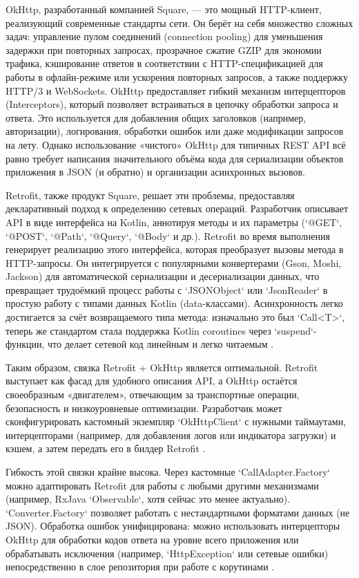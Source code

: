 OkHttp, разработанный компанией Square, — это мощный HTTP-клиент, реализующий современные стандарты сети. Он берёт на себя множество сложных задач: управление пулом соединений (connection pooling) для уменьшения задержки при повторных запросах, прозрачное сжатие GZIP для экономии трафика, кэширование ответов в соответствии с HTTP-спецификацией для работы в офлайн-режиме или ускорения повторных запросов, а также поддержку HTTP/3 и WebSockets. OkHttp предоставляет гибкий механизм интерцепторов (Interceptors), который позволяет встраиваться в цепочку обработки запроса и ответа. Это используется для добавления общих заголовков (например, авторизации), логирования, обработки ошибок или даже модификации запросов на лету. Однако использование «чистого» OkHttp для типичных REST API всё равно требует написания значительного объёма кода для сериализации объектов приложения в JSON (и обратно) и организации асинхронных вызовов.

Retrofit, также продукт Square, решает эти проблемы, предоставляя декларативный подход к определению сетевых операций. Разработчик описывает API в виде интерфейса на Kotlin, аннотируя методы и их параметры (`@GET`, `@POST`, `@Path`, `@Query`, `@Body` и др.). Retrofit во время выполнения генерирует реализацию этого интерфейса, которая преобразует вызовы метода в HTTP-запросы. Он интегрируется с популярными конвертерами (Gson, Moshi, Jackson) для автоматической сериализации и десериализации данных, что превращает трудоёмкий процесс работы с `JSONObject` или `JsonReader` в простую работу с типами данных Kotlin (data-классами). Асинхронность легко достигается за счёт возвращаемого типа метода: изначально это был `Call<T>`, теперь же стандартом стала поддержка Kotlin coroutines через `suspend`-функции, что делает сетевой код линейным и легко читаемым \cite{reff}.

Таким образом, связка Retrofit + OkHttp является оптимальной. Retrofit выступает как фасад для удобного описания API, а OkHttp остаётся своеобразным «двигателем», отвечающим за транспортные операции, безопасность и низкоуровневые оптимизации. Разработчик может сконфигурировать кастомный экземпляр `OkHttpClient` с нужными таймаутами, интерцепторами (например, для добавления логов или индикатора загрузки) и кэшем, а затем передать его в билдер Retrofit \cite{reff}.

Гибкость этой связки крайне высока. Через кастомные `CallAdapter.Factory` можно адаптировать Retrofit для работы с любыми другими механизмами (например, RxJava `Observable`, хотя сейчас это менее актуально). `Converter.Factory` позволяет работать с нестандартными форматами данных (не JSON). Обработка ошибок унифицирована: можно использовать интерцепторы OkHttp для обработки кодов ответа на уровне всего приложения или обрабатывать исключения (например, `HttpException` или сетевые ошибки) непосредственно в слое репозитория при работе с корутинами \cite{reff}.

